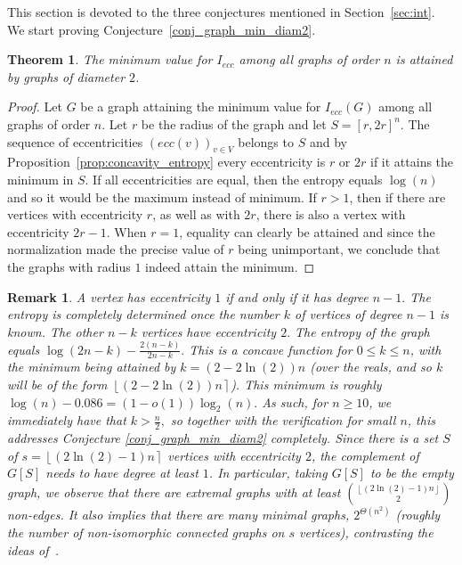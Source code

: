 \documentclass{article}
\newtheorem{thr}[defi]{Theorem}
\newtheorem{remark}[defi]{Remark}
\newcommand*{\floorceil}[1]{\left\lfloor #1\right\rceil}
\newcommand*{\bfloor}[1]{\left\lfloor #1\right\rfloor}
\newcommand{\ecc}{ecc}
\begin{document}
{%
This section is devoted to the three conjectures mentioned in Section~\ref{sec:int}. We start proving Conjecture~\ref{conj_graph_min_diam2}.


\begin{thr}
    The minimum value for $I_{\ecc}$ among all graphs of order $n$ is attained by graphs of diameter $2$.
\end{thr}

\begin{proof}
Let $G$ be a graph attaining the minimum value for $I_{\ecc}(G)$ among all graphs of order $n$. Let $r$ be the radius of the graph and let $S= [r,2r]^n.$ The sequence of eccentricities $\left(\ecc(v) \right)_{v \in V}$ belongs to $S$ and by Proposition~\ref{prop:concavity_entropy} 
every eccentricity is $r$ or $2r$ if it attains the minimum in $S$.
If all eccentricities are equal, then the entropy equals $\log(n)$ and so it would be the maximum instead of minimum.
If $r>1$, then if there are vertices with eccentricity $r$, as well as with $2r$, there is also a vertex with eccentricity $2r-1.$
When $r=1$, equality can clearly be attained and since the normalization made the precise value of $r$ being unimportant, we conclude that the graphs with radius $1$ indeed attain the minimum.
\end{proof}

\begin{remark}
    A vertex has eccentricity $1$ if and only if it has degree $n-1.$
    The entropy is completely determined once the number $k$ of vertices of degree $n-1$ is known. The other $n-k$ vertices have eccentricity $2.$
    The entropy of the graph equals $\log(2n-k)-\frac{2(n-k)}{2n-k}.$
    This is a concave function for $0 \le k \le n$, with the minimum being attained by $k=(2-2\ln(2)) n$ (over the reals, and so $k $ will be of the form $\floorceil {(2-2\ln(2)) n}$). This minimum is roughly $\log(n)-0.086=(1-o(1))\log_2(n).$
    As such, for $n \ge 10$, we immediately have that $k > \frac n2,$ so together with the verification for small $n$, this addresses Conjecture \ref{conj_graph_min_diam2} %
    completely.
    Since there is a set $S$ of $s=\floorceil{(2\ln(2)-1) n}$ vertices with eccentricity $2$, the complement of $G[S]$ needs to have degree at least $1$.
    In particular, taking $G[S]$ to be the empty graph, we observe that there are extremal graphs with at least $ \binom{\bfloor{(2\ln(2)-1) n}}{2}$ non-edges. It also implies that there are many minimal graphs, $2^{\Theta(n^2)}$ (roughly the number of non-isomorphic connected graphs on $s$ vertices), contrasting the ideas of~\cite{KDM13}.
\end{remark}

}
\end{document}
